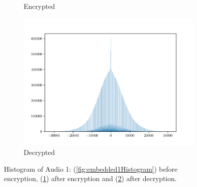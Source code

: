 \documentclass[a4paper]{cas-sc}
\begin{document}
\begin{figure}[pos=h]
\begin{subfigure}[h]{0.3\textwidth}
\begin{center}
            \caption{Encrypted}
            \label{fig:encrypted1Histogram}
        \end{center}
    \end{subfigure}
    \begin{subfigure}[h]{0.3\textwidth}
        \begin{center}
            \includegraphics[width=\textwidth]{decrypted1Histogram.png}
            \caption{Decrypted}
            \label{fig:decrypted1Histogram}
        \end{center}
    \end{subfigure}
    \caption{Histogram of Audio 1: (\ref{fig:embedded1Histogram}) before encryption, (\ref{fig:encrypted1Histogram}) after encryption and (\ref{fig:decrypted1Histogram}) after decryption.}
    \label{fig:audio1Histogram}
\end{figure}
\end{document}
